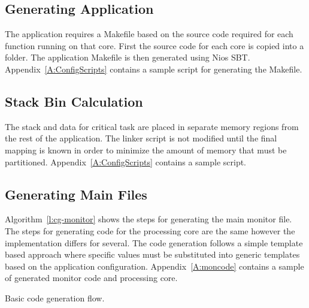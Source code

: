 \subsection{Generating Application}

	The application requires a Makefile based on the source code required for each function running on that core. First the source code for each core is copied into a folder. The application Makefile is then generated using Nios SBT. Appendix~\ref{A:ConfigScripts} contains a sample script for generating the Makefile. 

\subsection{Stack Bin Calculation}

	The stack and data for critical task are placed in separate memory regions from the rest of the application. 
	The linker script is not modified until the final mapping is known in order to minimize the amount of memory that must be partitioned.
	Appendix~\ref{A:ConfigScripts} contains a sample script.

\subsection{Generating Main Files}

	Algorithm~\ref{l:cg-monitor} shows the steps for generating the main monitor file. 
	The steps for generating code for the processing core are the same however the implementation differs for several. 
	The code generation follows a simple template based approach where specific values must be substituted into generic templates based on the application configuration.
	Appendix~\ref{A:moncode} contains a sample of generated monitor code and processing core.


\begin{algorithm}

\caption{Basic code generation flow.}
\label{l:cg-monitor}
\end{algorithm}

